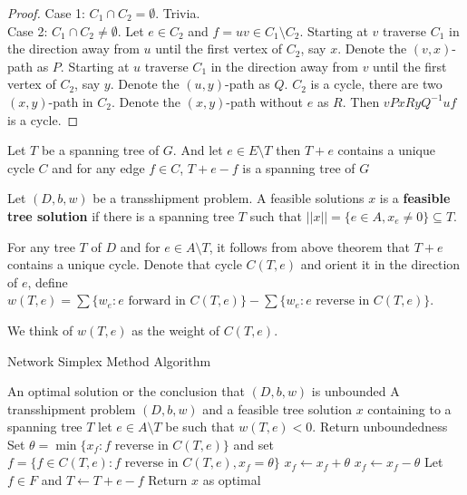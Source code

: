 			\begin{proof}
				Case 1: $C_1 \cap C_2 = \emptyset$. Trivia.\\
				Case 2: $C_1 \cap C_2 \neq \emptyset$. Let $e\in C_2$ and $f=uv \in C_1 \setminus C_2$. Starting at $v$ traverse $C_1$ in the direction away from $u$ until the first vertex of $C_2$, say $x$. Denote the $(v, x)$-path as $P$. Starting at $u$ traverse $C_1$ in the direction away from $v$ until the first vertex of $C_2$, say $y$. Denote the $(u, y)$-path as $Q$. $C_2$ is a cycle, there are two $(x, y)$-path in $C_2$. Denote the $(x, y)$-path without $e$ as $R$. Then $vPxRyQ^{-1}uf$ is a cycle.
			\end{proof}

			\begin{theorem}
				Let $T$ be a spanning tree of $G$. And let $e\in E\setminus T$ then $T+e$ contains a unique cycle $C$ and for any edge $f\in C$, $T+e-f$ is a spanning tree of $G$
			\end{theorem}

			Let $(D, b, w)$ be a transshipment problem. A feasible solutions $x$ is a \textbf{feasible tree solution} if there is a spanning tree $T$ such that $||x|| = \{e\in A, x_e\neq 0\} \subseteq T$.

			For any tree $T$ of $D$ and for $e\in A\setminus T$, it follows from above theorem that $T+e$ contains a unique cycle. Denote that cycle $C(T, e)$ and orient it in the direction of $e$, define $w(T, e) = \sum\{w_e: e \text{ forward in } C(T, e)\} - \sum\{w_e: e \text{ reverse in } C(T,e)\}$.

			We think of $w(T, e)$ as the weight of $C(T,e)$.

			\begin{algorithm}
				\caption{Network Simplex Method Algorithm}
				\begin{algorithmic}
					\ENSURE An optimal solution or the conclusion that $(D, b, w)$ is unbounded
					\REQUIRE A transshipment problem $(D, b, w)$ and a feasible tree solution $x$ containing to a spanning tree $T$
						\STATE let $e \in A \setminus T$ be such that $w(T, e) < 0$.
							\STATE Return unboundedness
						\ELSE
							\STATE Set $\theta = \min\{x_f: f \text{ reverse in } C(T, e)\}$ and set $f = \{f\in C(T, e): f \text{ reverse in } C(T, e), x_f = \theta\}$
								\STATE $x_f \gets x_f + \theta$
							\ELSE
								\STATE $x_f \gets x_f - \theta$
							\ENDIF
							\STATE Let $f \in F$ and $T \gets T+e-f$
						\ENDIF
					\ENDWHILE
					\STATE Return $x$ as optimal					
				\end{algorithmic}
			\end{algorithm}

